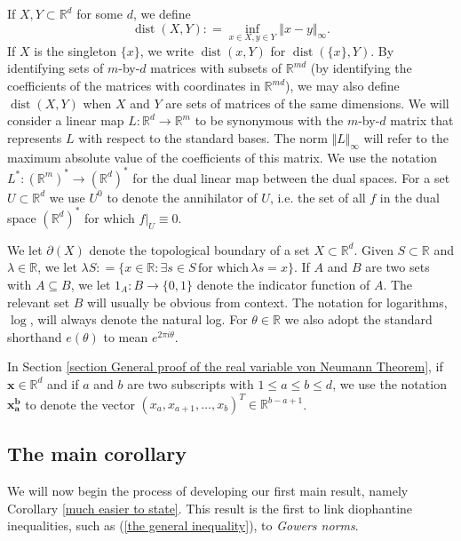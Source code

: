 \documentclass[12pt,a4paper,twoside,reqno]{amsart}
\newcommand{\dist}{\operatorname{dist}}
\numberwithin{equation}{section}
\begin{document}
If $X,Y\subset\mathbb{R}^d$ for some $d$, we define \[\operatorname{dist}(X,Y): = \inf\limits_{x\in X, y\in Y} \Vert x - y\Vert_{\infty}.\] If $X$ is the singleton $\{x\}$, we write $\operatorname{dist}(x,Y)$ for $\operatorname{dist}(\{x\},Y)$. By identifying sets of $m$-by-$d$ matrices with subsets of $\mathbb{R}^{md}$ (by identifying the coefficients of the matrices with coordinates in $\mathbb{R}^{md}$), we may also define $\dist(X,Y)$ when $X$ and $Y$ are sets of matrices of the same dimensions. We will consider a linear map $L:\mathbb{R}^d \longrightarrow \mathbb{R}^m$ to be synonymous with the $m$-by-$d$ matrix that represents $L$ with respect to the standard bases. The norm $\Vert L\Vert_\infty$ will refer to the maximum absolute value of the coefficients of this matrix. We use the notation $L^*: (\mathbb{R}^m)^* \longrightarrow (\mathbb{R}^d)^*$ for the dual linear map between the dual spaces. For a set $U \subset \mathbb{R}^d$ we use $U^{0}$ to denote the annihilator of $U$, i.e. the set of all $f$ in the dual space $(\mathbb{R}^d)^*$ for which $f|_U \equiv 0$. 


We let $\partial(X)$ denote the topological boundary of a set $X \subset \mathbb{R}^d$. Given $S \subset \mathbb{R}$ and $\lambda \in \mathbb{R}$, we let $\lambda S: = \{ x \in \mathbb{R}: \exists s \in S \, \text{for which} \, \lambda s = x\}.$ If $A$ and $B$ are two sets with $A\subseteq B$, we let $1_A:B\longrightarrow \{0,1\}$ denote the indicator function of $A$. The relevant set $B$ will usually be obvious from context. The notation for logarithms, $\log$, will always denote the natural log. For $\theta \in \mathbb{R}$ we also adopt the standard shorthand $e(\theta)$ to mean $e^{2\pi i \theta}$. 


In Section \ref{section General proof of the real variable von Neumann Theorem}, if $\mathbf{x} \in \mathbb{R}^d$ and if $a$ and $b$ are two subscripts with $1\leqslant a\leqslant b\leqslant d$, we use the notation $\mathbf{x_a^b}$ to denote the vector $(x_a,x_{a+1},\dots,x_{b})^T \in \mathbb{R}^{b-a+1}$. 


\subsection{The main corollary}
We will now begin the process of developing our first main result, namely Corollary \ref{much easier to state}. This result is the first to link diophantine inequalities, such as (\ref{the general inequality}), to \emph{Gowers norms}. 
\end{document}

